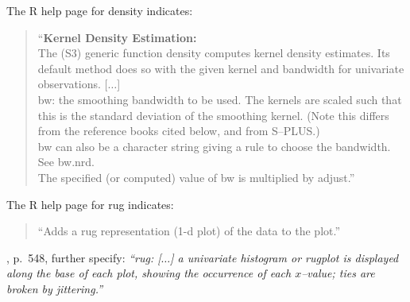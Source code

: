 \documentclass[12pt,letterpaper,final]{article}
\begin{document}
The R help page for density indicates:
\begin{quotation}
\noindent
``{\bf Kernel Density Estimation:} \\[0.2cm]
The (S3) generic function density computes kernel density estimates. 
Its default method does so with the given kernel and bandwidth for univariate observations. 
[$\ldots$] \\
bw: the smoothing bandwidth to be used. The kernels are scaled such that this is the 
standard deviation of the smoothing kernel. (Note this differs from the reference books 
cited below, and from S--PLUS.) \\
bw can also be a character string giving a rule to choose the bandwidth. See bw.nrd. \\
The specified (or computed) value of bw is multiplied by adjust.''
\end{quotation}


The R help page for rug indicates:
\begin{quotation}
``Adds a rug representation (1-d plot) of the data to the plot.''
\end{quotation}

\cite{CH93}, p.~548, further specify: {\it ``rug: [$\ldots$]
a univariate histogram or rugplot is displayed along the base 
of each plot, showing the occurrence of each $x$--value; ties are
broken by jittering.''}
\end{document}
